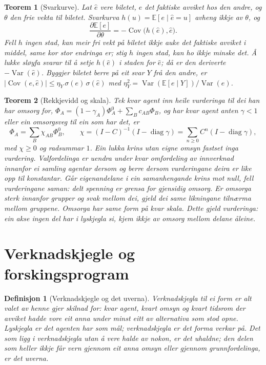 \documentclass[9pt,twocolumn,a4paper]{article}
\theoremstyle{defstyle}
\newtheorem{definisjon}{Definisjon}
\theoremstyle{formstyle}
\newtheorem{teorem}{Teorem}
\begin{document}
\begin{teorem}[Svarkurve]
Lat $\hat e$ vere biletet, $e$ det faktiske avviket hos den andre, og $\theta$ den frie vekta til biletet. Svarkurva $h(u)=\mathbb{E}[e\mid\hat e=u]$ avheng ikkje av $\theta$, og
\[
\frac{\partial\mathbb{E}[e]}{\partial\theta}=-\operatorname{Cov}\bigl(h(\hat e),\hat e\bigr).
\]
Fell $h$ ingen stad, kan meir fri vekt på biletet ikkje auke det faktiske avviket i middel, same kor stor endringa er; stig $h$ ingen stad, kan ho ikkje minske det. Å lukke sløyfa svarar til å setje $h(\hat e)$ i staden for $\hat e$; då er den deriverte $-\operatorname{Var}(\hat e)$. Byggjer biletet berre på eit svar $Y$ frå den andre, er $|\operatorname{Cov}(e,\hat e)|\leq\eta_Y\,\sigma(e)\,\sigma(\hat e)$ med $\eta_Y^2=\operatorname{Var}(\mathbb{E}[e\mid Y])/\operatorname{Var}(e)$.
\end{teorem}

\begin{teorem}[Rekkjevidd og skala]
Tek kvar agent inn heile vurderinga til dei han har omsorg for, $\Phi_A=(1-\gamma_A)\Phi_A^0+\sum_Bc_{AB}\Phi_B$, og har kvar agent anten $\gamma<1$ eller ein omsorgsveg til ein som har det, er
\[
\Phi_A=\sum_B\chi_{AB}\Phi_B^0,\qquad \chi=(I-C)^{-1}(I-\operatorname{diag}\gamma)=\sum_{n\geq 0}C^n(I-\operatorname{diag}\gamma),
\]
med $\chi\geq 0$ og radsummar $1$. Ein lukka krins utan eigne omsyn fastset inga vurdering. Valfordelinga er uendra under kvar omfordeling av innverknad innanfor ei samling agentar dersom og berre dersom vurderingane deira er like opp til konstantar. Går eigenandelane i ein samanhengande krins mot null, fell vurderingane saman: delt spenning er grensa for gjensidig omsorg. Er omsorga sterk innanfor grupper og svak mellom dei, gjeld dei same likningane tilnærma mellom gruppene. Omsorga har same form på kvar skala. Dette gjeld vurderinga: ein akse ingen del har i lyskjegla si, kjem ikkje av omsorg mellom delane åleine.
\end{teorem}

\section{Verknadskjegle og forskingsprogram}

\begin{definisjon}[Verknadskjegle og det uverna]
\emph{Verknadskjegla} til ei form er alt valet av henne gjer skilnad for: kvar agent, kvart omsyn og kvart tidsrom der avviket hadde vore eit anna under minst eitt av alternativa som stod opne. Lyskjegla er det agenten har som mål; verknadskjegla er det forma verkar på. Det som ligg i verknadskjegla utan å vere halde av nokon, er \emph{det uhaldne}; den delen som heller ikkje får vern gjennom eit anna omsyn eller gjennom grunnfordelinga, er \emph{det uverna}.
\end{definisjon}
\end{document}
